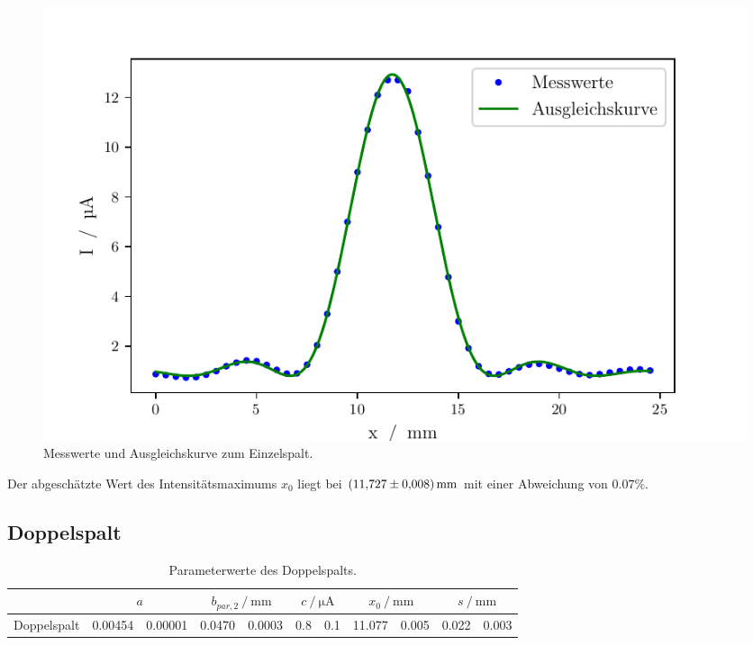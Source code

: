 \begin{figure}
    \centering
    \includegraphics[width=.9\textwidth]{python/EinzelspaltFit.pdf}
    \caption{Messwerte und Ausgleichskurve zum Einzelspalt.}
    \label{fig:messEinzel}
\end{figure}

Der abgeschätzte Wert des Intensitätsmaximums $x_0$ liegt bei $\SI{11.727 \pm 0.008}{\milli\meter}$ mit einer Abweichung von $0.07\%$.

\subsection{Doppelspalt}
\begin{table}
    \centering
    \caption{Parameterwerte des Doppelspalts.}
    \label{tab:parDoppel}
    \begin{tabular}{c S[table-format=1.5]@{\,\( \pm \)\,}S[table-format=1.5] 
        S[table-format=1.4]@{\,\( \pm \)\,}S[table-format=1.4] 
        S[table-format=1.1]@{\,\( \pm \)\,}S[table-format=1.1]
        S[table-format=1.3]@{\,\( \pm \)\,}S[table-format=1.3]
        S[table-format=1.3]@{\,\( \pm \)\,}S[table-format=1.3]}
        \toprule
        &  &  &  &  & \\
        \midrule
        Doppelspalt & 0.00454&0.00001 & 0.0470&0.0003 & 0.8&0.1 & 11.077&0.005 & 0.022&0.003\\
    \end{tabular}
\end{table}

